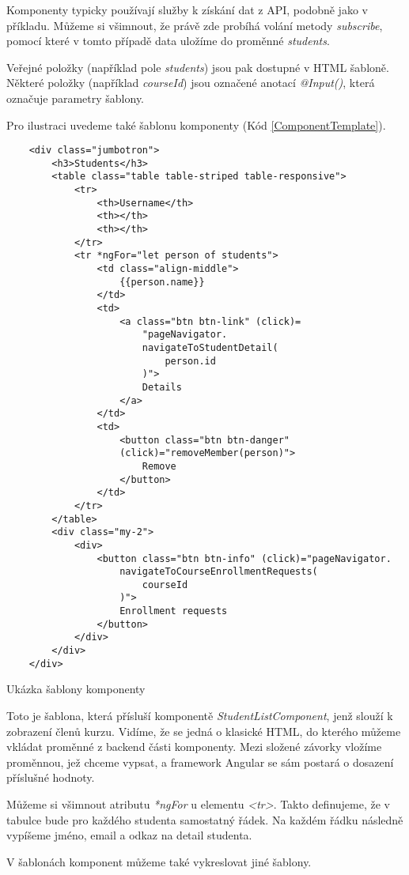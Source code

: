 Komponenty typicky používají služby k získání dat z API, podobně jako v příkladu. Můžeme si všimnout, že právě zde probíhá volání metody \textit{subscribe}, pomocí které v tomto případě data uložíme do proměnné \textit{students}.

Veřejné položky (například pole \textit{students}) jsou pak dostupné v HTML šabloně. Některé položky (například \textit{courseId}) jsou označené anotací \textit{@Input()}, která označuje parametry šablony.

Pro ilustraci uvedeme také šablonu komponenty (Kód \ref{ComponentTemplate}).

\lstset{style=html}

\begin{program}
	\begin{lstlisting}
	<div class="jumbotron">
		<h3>Students</h3>
		<table class="table table-striped table-responsive">
			<tr>
				<th>Username</th>
				<th></th>
				<th></th>
			</tr>
			<tr *ngFor="let person of students">
				<td class="align-middle">
					{{person.name}}
				</td>
				<td>
					<a class="btn btn-link" (click)=
						"pageNavigator.
						navigateToStudentDetail(
							person.id
						)">
						Details
					</a>
				</td>
				<td>
					<button class="btn btn-danger" 
					(click)="removeMember(person)">
						Remove
					</button>
				</td>
			</tr>
		</table>
		<div class="my-2">
			<div>
				<button class="btn btn-info" (click)="pageNavigator.
					navigateToCourseEnrollmentRequests(
						courseId
					)">
					Enrollment requests
				</button>
			</div>
		</div>
	</div>
	\end{lstlisting}
	\caption{Ukázka šablony komponenty}
	\label{ComponentTemplate}
\end{program}

Toto je šablona, která přísluší komponentě \textit{StudentListComponent}, jenž slouží k zobrazení členů kurzu. Vidíme, že se jedná o klasické HTML, do kterého můžeme vkládat proměnné z backend části komponenty.
Mezi složené závorky vložíme proměnnou, jež chceme vypsat, a framework Angular se sám postará o dosazení příslušné hodnoty.

Můžeme si všimnout atributu \textit{*ngFor} u elementu \textit{<tr>}. Takto definujeme, že v tabulce bude pro každého studenta samostatný řádek.
Na každém řádku následně vypíšeme jméno, email a odkaz na detail studenta.

\vspace{\baselineskip}

V šablonách komponent můžeme také vykreslovat jiné šablony.

